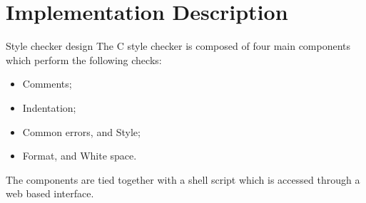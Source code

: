\documentclass[compress]{beamer}
\begin{document}

\section{Implementation Description}

\begin{frame}{Style checker design}
    The C style checker is composed of four main components which perform the following
    checks:
    \begin{itemize}
        \item Comments;
        \item Indentation;
        \item Common errors, and Style;
        \item Format, and White space.
    \end{itemize}
        The components are tied together with a shell script which is accessed
    through a web based interface.
\end{frame}


\end{document}
